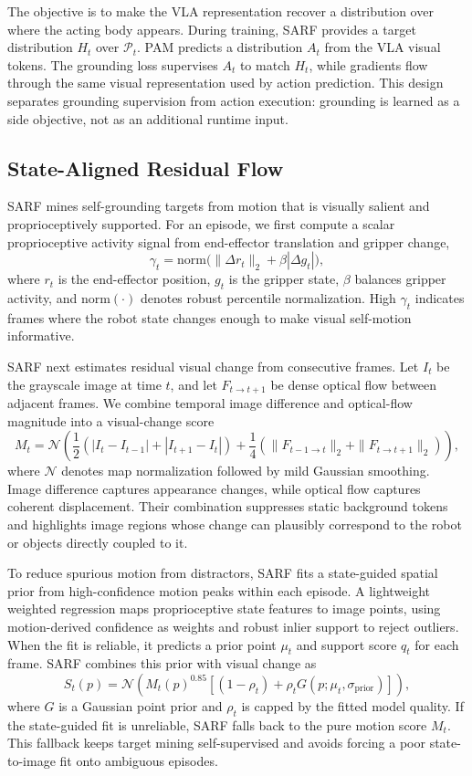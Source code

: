The objective is to make the VLA representation recover a distribution over
where the acting body appears. During training, SARF provides a target
distribution \(H_t\) over \(\mathcal{P}_t\). PAM predicts a distribution
\(A_t\) from the VLA visual tokens. The grounding loss supervises \(A_t\) to
match \(H_t\), while gradients flow through the same visual representation used
by action prediction. This design separates grounding supervision from action
execution: grounding is learned as a side objective, not as an additional
runtime input.

\setcounter{subsection}{1}
\subsection{State-Aligned Residual Flow}

SARF mines self-grounding targets from motion that is visually salient and
proprioceptively supported. For an episode, we first compute a scalar
proprioceptive activity signal from end-effector translation and gripper
change,
\[
    \gamma_t=\mathrm{norm}\bigl(\|\Delta r_t\|_2+\beta |\Delta g_t|\bigr),
\]
where \(r_t\) is the end-effector position, \(g_t\) is the gripper state,
\(\beta\) balances gripper activity, and \(\mathrm{norm}(\cdot)\) denotes
robust percentile normalization. High \(\gamma_t\) indicates frames where the
robot state changes enough to make visual self-motion informative.

SARF next estimates residual visual change from consecutive frames. Let
\(I_t\) be the grayscale image at time \(t\), and let \(F_{t\rightarrow t+1}\)
be dense optical flow between adjacent frames. We combine temporal image
difference and optical-flow magnitude into a visual-change score
\[
    M_t
    =
    \mathcal{N}\left(
    \frac{1}{2}\left(|I_t-I_{t-1}|+|I_{t+1}-I_t|\right)
    +
    \frac{1}{4}\left(\|F_{t-1\rightarrow t}\|_2+\|F_{t\rightarrow t+1}\|_2\right)
    \right),
\]
where \(\mathcal{N}\) denotes map normalization followed by mild Gaussian
smoothing. Image difference captures appearance changes, while optical flow
captures coherent displacement. Their combination suppresses static background
tokens and highlights image regions whose change can plausibly correspond to
the robot or objects directly coupled to it.

To reduce spurious motion from distractors, SARF fits a state-guided spatial
prior from high-confidence motion peaks within each episode. A lightweight
weighted regression maps proprioceptive state features to image points, using
motion-derived confidence as weights and robust inlier support to reject
outliers. When the fit is reliable, it predicts a prior point \(\mu_t\) and
support score \(q_t\) for each frame. SARF combines this prior with visual
change as
\[
    S_t(p)
    =
    \mathcal{N}\left(
    M_t(p)^{0.85}
    \left[(1-\rho_t)+\rho_t G(p;\mu_t,\sigma_{\mathrm{prior}})\right]
    \right),
\]
where \(G\) is a Gaussian point prior and \(\rho_t\) is capped by the fitted
model quality. If the state-guided fit is unreliable, SARF falls back to the
pure motion score \(M_t\). This fallback keeps target mining self-supervised
and avoids forcing a poor state-to-image fit onto ambiguous episodes.

